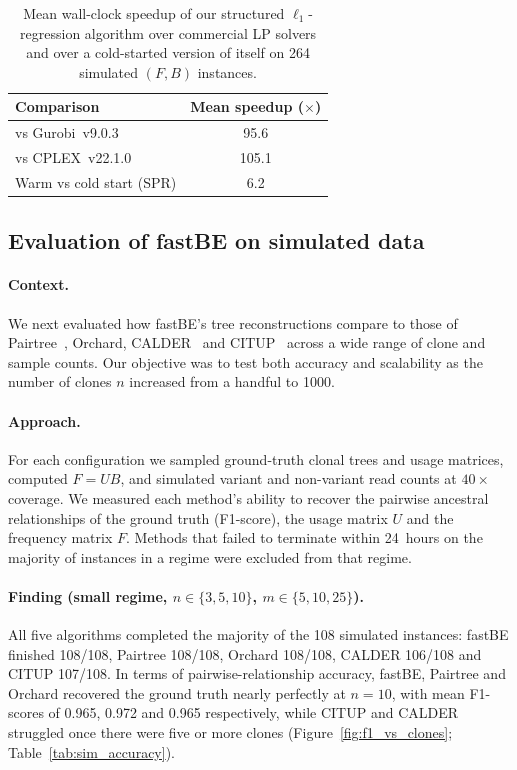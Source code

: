 \documentclass[11pt]{article}
\begin{document}
\begin{table}[htbp]
\centering
\caption{Mean wall-clock speedup of our structured $\ell_1$-regression algorithm over commercial LP solvers and over a cold-started version of itself on 264 simulated $(F, B)$ instances.}
\label{tab:speedups}
\begin{tabular}{lc}
\toprule
Comparison & Mean speedup ($\times$) \\
\midrule
vs Gurobi~v9.0.3 & 95.6 \\
vs CPLEX~v22.1.0 & 105.1 \\
Warm vs cold start (SPR) & 6.2 \\
\bottomrule
\end{tabular}
\end{table}

\subsection{Evaluation of fastBE on simulated data}

\paragraph{Context.}
We next evaluated how fastBE's tree reconstructions compare to those of Pairtree~\citep{wintersinger2022pairtree}, Orchard, CALDER~\citep{myers2019calder} and CITUP~\citep{malikic2015citup} across a wide range of clone and sample counts. Our objective was to test both accuracy and scalability as the number of clones $n$ increased from a handful to 1000.

\paragraph{Approach.}
For each configuration we sampled ground-truth clonal trees and usage matrices, computed $F = UB$, and simulated variant and non-variant read counts at $40\times$ coverage. We measured each method's ability to recover the pairwise ancestral relationships of the ground truth (F1-score), the usage matrix $U$ and the frequency matrix $F$. Methods that failed to terminate within 24~hours on the majority of instances in a regime were excluded from that regime.

\paragraph{Finding (small regime, $n\in\{3,5,10\}$, $m\in\{5,10,25\}$).}
All five algorithms completed the majority of the 108 simulated instances: fastBE finished 108/108, Pairtree 108/108, Orchard 108/108, CALDER 106/108 and CITUP 107/108. In terms of pairwise-relationship accuracy, fastBE, Pairtree and Orchard recovered the ground truth nearly perfectly at $n=10$, with mean F1-scores of 0.965, 0.972 and 0.965 respectively, while CITUP and CALDER struggled once there were five or more clones (Figure~\ref{fig:f1_vs_clones}; Table~\ref{tab:sim_accuracy}).
\end{document}
